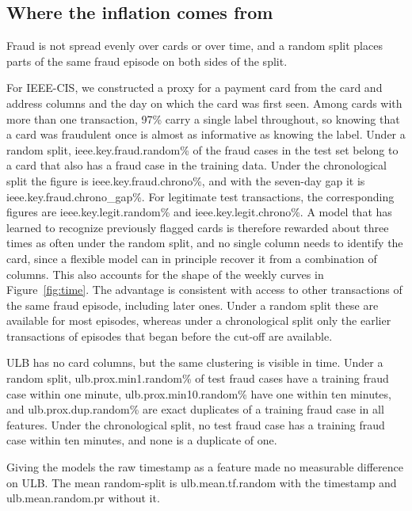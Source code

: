 \subsection{Where the inflation comes from}
\label{sec:mechanism}

Fraud is not spread evenly over cards or over time, and a random split places parts of the same fraud episode on both sides of the split.

For IEEE-CIS, we constructed a proxy for a payment card from the card and address columns and the day on which the card was first seen. Among cards with more than one transaction, 97\% carry a single label throughout, so knowing that a card was fraudulent once is almost as informative as knowing the label. Under a random split, \num{ieee.key.fraud.random}\% of the fraud cases in the test set belong to a card that also has a fraud case in the training data. Under the chronological split the figure is \num{ieee.key.fraud.chrono}\%, and with the seven-day gap it is \num{ieee.key.fraud.chrono_gap}\%. For legitimate test transactions, the corresponding figures are \num{ieee.key.legit.random}\% and \num{ieee.key.legit.chrono}\%. A model that has learned to recognize previously flagged cards is therefore rewarded about three times as often under the random split, and no single column needs to identify the card, since a flexible model can in principle recover it from a combination of columns. This also accounts for the shape of the weekly curves in Figure~\ref{fig:time}. The advantage is consistent with access to other transactions of the same fraud episode, including later ones. Under a random split these are available for most episodes, whereas under a chronological split only the earlier transactions of episodes that began before the cut-off are available.

ULB has no card columns, but the same clustering is visible in time. Under a random split, \num{ulb.prox.min1.random}\% of test fraud cases have a training fraud case within one minute, \num{ulb.prox.min10.random}\% have one within ten minutes, and \num{ulb.prox.dup.random}\% are exact duplicates of a training fraud case in all features. Under the chronological split, no test fraud case has a training fraud case within ten minutes, and none is a duplicate of one.

Giving the models the raw timestamp as a feature made no measurable difference on ULB. The mean random-split \prauc{} is \num{ulb.mean.tf.random} with the timestamp and \num{ulb.mean.random.pr} without it.

